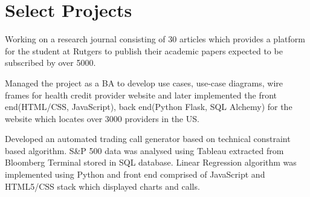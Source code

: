 \documentclass[]{deedy-resume-openfont}
\begin{document}
\begin{minipage}[t]{0.66\textwidth}

\section{Select Projects}
Working on a research journal consisting of 30 articles which provides a platform for the student at Rutgers to publish their academic papers expected to be subscribed by over 5000. \textbf
\sectionsep

\item  Managed the project as a BA to develop use cases, use-case diagrams, wire frames for health credit provider website and later implemented the front end(HTML/CSS, JavaScript), back end(Python Flask, SQL Alchemy) for the website which locates over 3000 providers in the US.\textbf
\sectionsep

Developed an automated trading call generator based on technical constraint based algorithm. S&P 500 data was analysed using Tableau extracted from Bloomberg Terminal stored in SQL database. Linear Regression algorithm was implemented using Python and front end comprised of JavaScript and HTML5/CSS stack which displayed charts and calls.  \textbf
\sectionsep


\end{minipage} 
\end{document}
